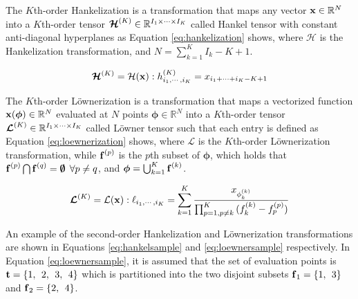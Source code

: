 \documentclass[sensors,article,submit,moreauthors,pdftex]{Definitions/mdpi}
\newcommand{\mathvec}[1]{\boldsymbol{\mathbf{\MakeLowercase{#1}}}}
\newcommand{\mathten}[1]{\boldsymbol{\mathbf{\mathcal{\MakeUppercase{#1}}}}}
\begin{document}
\begin{Definition}
	\label{def:hankeltrans}
	The $K$th-order Hankelization is a transformation that maps any vector $\mathvec{x}\in\mathbb{R}^N$ into a $K$th-order tensor $\mathten{H}^{(K)} \in\mathbb{R}^{I_1 \times \cdots \times I_K}$ called Hankel tensor with constant anti-diagonal hyperplanes as Equation \ref{eq:hankelization} shows, where $\mathcal{H}$ is the Hankelization transformation, and $N = \sum_{k=1}^{K} {I_k} - K + 1$.
	
	\begin{equation}
	\mathten{H}^{(K)} = \mathcal{H}(\mathvec{x}) :  h^{(K)}_{i_1,\cdots,i_K} = x_{i_1 + \cdots + i_K - K + 1} %
	\label{eq:hankelization}
	\end{equation}
\end{Definition}

\begin{Definition}
	\label{def:loewnertrans}
	The $K$th-order L{\"o}wnerization is a transformation that maps a vectorized function $\mathvec{x}(\boldsymbol{\phi})\in\mathbb{R}^N$ evaluated at $N$ points $\boldsymbol{\phi}\in\mathbb{R}^{N}$ into a $K$th-order tensor $\mathten{L}^{(K)} \in \mathbb{R}^{I_1 \times \cdots \times I_K}$ called L{\"o}wner tensor such that each entry is defined as Equation \ref{eq:loewnerization} shows, where $\mathcal{L}$ is the $K$th-order L{\"o}wnerization transformation, while $\mathvec{f}^{(p)}$ is the $p$th subset of $\boldsymbol{\phi}$, which holds that  $\mathvec{f}^{(p)} \bigcap \mathvec{f}^{(q)} = \boldsymbol{\emptyset} \:\:\forall p \neq q$, and $\boldsymbol{\phi}=\bigcup_{k=1}^{K} {\mathvec{f}^{(k)}}$.
	
	\begin{equation}
	\mathten{L}^{(K)} = \mathcal{L}(\mathvec{x}) : \ell_{i_1,\cdots,i_K} = \sum_{k=1}^{K}{ \frac{x_{\phi_{k}^{(k)}}}{\prod_{p=1,p\neq k}^{K}{(f_{k}^{(k)} - f_p^{(p)})}}}
	\label{eq:loewnerization}
	\end{equation}
\end{Definition}

An example of the second-order Hankelization and  L{\"o}wnerization transformations are shown in Equations \ref{eq:hankelsample} and \ref{eq:loewnersample} respectively. In Equation \ref{eq:loewnersample}, it is assumed that the set of evaluation points is $\mathvec{t}=\{1,\:\:2,\:\:3,\:\:4\}$ which is partitioned into the two disjoint subsets $\mathvec{f}_1=\{1,\:\:3\}$ and $\mathvec{f}_2=\{2,\:\:4\}$.
\end{document}
